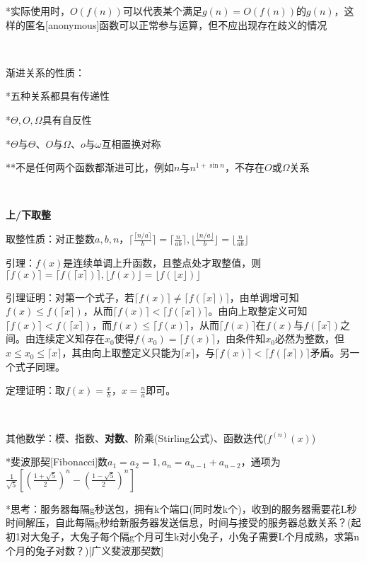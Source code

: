 \documentclass[a4paper,UTF8,fontset=windows]{ctexart}
\begin{document}
*\hspace{0em}实际使用时，$O(f(n))$可以代表某个满足$g(n)=O(f(n))$的$g(n)$，这样的匿名[anonymous]函数可以正常参与运算，但不应出现存在歧义的情况

\

渐进关系的性质：

*\hspace{0em}五种关系都具有传递性

*\hspace{0em}$\Theta,O,\Omega$具有自反性

*\hspace{0em}$\Theta$与$\Theta$、$O$与$\Omega$、$o$与$\omega$互相置换对称

**\hspace{0em}不是任何两个函数都渐进可比，例如$n$与$n^{1+\sin n}$，不存在$O$或$\Omega$关系

\

\textbf{上/下取整}

取整性质：对正整数$a,b,n$，$\lceil\frac{\lceil n/a\rceil}{b}\rceil=\lceil\frac{n}{ab}\rceil,\lfloor\frac{\lfloor n/a\rfloor}{b}\rfloor=\lfloor\frac{n}{ab}\rfloor$

引理：$f(x)$是连续单调上升函数，且整点处才取整值，则$\lceil f(x)\rceil=\lceil f(\lceil x\rceil)\rceil,\lfloor f(x)\rfloor=\lfloor f(\lfloor x\rfloor)\rfloor$

引理证明：对第一个式子，若$\lceil f(x)\rceil\ne\lceil f(\lceil x\rceil)\rceil$，由单调增可知$f(x)\le f(\lceil x\rceil)$，从而$\lceil f(x)\rceil<\lceil f(\lceil x\rceil)\rceil$。由向上取整定义可知$\lceil f(x)\rceil<f(\lceil x\rceil)$，而$f(x)\le\lceil f(x)\rceil$，从而$\lceil f(x)\rceil$在$f(x)$与$f(\lceil x\rceil)$之间。由连续定义知存在$x_0$使得$f(x_0)=\lceil f(x)\rceil$，由条件知$x_0$必然为整数，但$x\le x_0\le\lceil x\rceil$，其由向上取整定义只能为$\lceil x\rceil$，与$\lceil f(x)\rceil<\lceil f(\lceil x\rceil)\rceil$矛盾。另一个式子同理。

定理证明：取$f(x)=\frac{x}{b}$，$x=\frac{n}{a}$即可。

\

其他数学：模、指数、\textbf{对数}、阶乘(Stirling公式)、函数迭代($f^{(n)}(x)$)

*\hspace{0em}斐波那契[Fibonacci]数$a_1=a_2=1,a_n=a_{n-1}+a_{n-2}$，通项为$\frac{1}{\sqrt5}\left[\left(\frac{1+\sqrt5}{2}\right)^n-\left(\frac{1-\sqrt5}{2}\right)^n\right]$

*\hspace{0em}思考：服务器每隔g秒送包，拥有k个端口(同时发k个)，收到的服务器需要花L秒时间解压，自此每隔g秒给新服务器发送信息，时间与接受的服务器总数关系？(起初1对大兔子，大兔子每个隔g个月可生k对小兔子，小兔子需要L个月成熟，求第n个月的兔子对数？)[广义斐波那契数]
\end{document}
